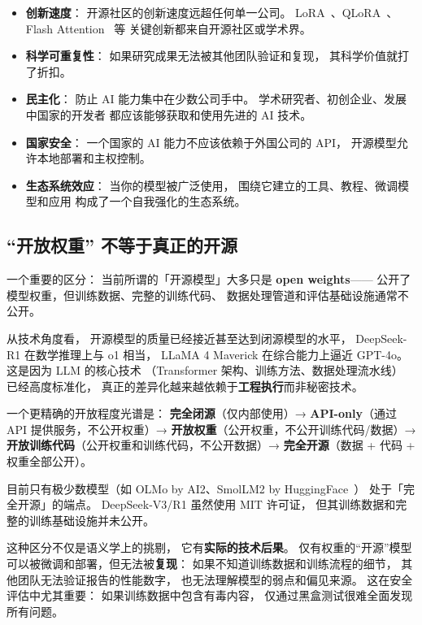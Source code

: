 \begin{itemize}[noitemsep]
  \item \textbf{创新速度}：
        开源社区的创新速度远超任何单一公司。
        LoRA~\cite{hu2021lora}、QLoRA~\cite{dettmers2023qlora}、
        Flash Attention~\cite{dao2022flashattention} 等
        关键创新都来自开源社区或学术界。
  \item \textbf{科学可重复性}：
        如果研究成果无法被其他团队验证和复现，
        其科学价值就打了折扣。
  \item \textbf{民主化}：
        防止 AI 能力集中在少数公司手中。
        学术研究者、初创企业、发展中国家的开发者
        都应该能够获取和使用先进的 AI 技术。
  \item \textbf{国家安全}：
        一个国家的 AI 能力不应该依赖于外国公司的 API，
        开源模型允许本地部署和主权控制。
  \item \textbf{生态系统效应}：
        当你的模型被广泛使用，
        围绕它建立的工具、教程、微调模型和应用
        构成了一个自我强化的生态系统。
\end{itemize}

\subsection{“开放权重” 不等于真正的开源}

一个重要的区分：
当前所谓的「开源模型」大多只是 \textbf{open weights}——
公开了模型权重，但训练数据、完整的训练代码、
数据处理管道和评估基础设施通常不公开。

从技术角度看，
开源模型的质量已经接近甚至达到闭源模型的水平，
DeepSeek-R1 在数学推理上与 o1 相当，
LLaMA 4 Maverick 在综合能力上逼近 GPT-4o。
这是因为 LLM 的核心技术
（Transformer 架构、训练方法、数据处理流水线）
已经高度标准化，
真正的差异化越来越依赖于\textbf{工程执行}而非秘密技术。

一个更精确的开放程度光谱是：
\textbf{完全闭源}（仅内部使用）→
\textbf{API-only}（通过 API 提供服务，不公开权重）→
\textbf{开放权重}（公开权重，不公开训练代码/数据）→
\textbf{开放训练代码}（公开权重和训练代码，不公开数据）→
\textbf{完全开源}（数据 + 代码 + 权重全部公开）。

目前只有极少数模型（如 OLMo by AI2、SmolLM2 by HuggingFace~\cite{allal2025smollm2}）
处于「完全开源」的端点。
DeepSeek-V3/R1 虽然使用 MIT 许可证，
但其训练数据和完整的训练基础设施并未公开。

这种区分不仅是语义学上的挑剔，
它有\textbf{实际的技术后果}。
仅有权重的“开源”模型
可以被微调和部署，但无法被\textbf{复现}：
如果不知道训练数据和训练流程的细节，
其他团队无法验证报告的性能数字，
也无法理解模型的弱点和偏见来源。
这在安全评估中尤其重要：
如果训练数据中包含有毒内容，
仅通过黑盒测试很难全面发现所有问题。

